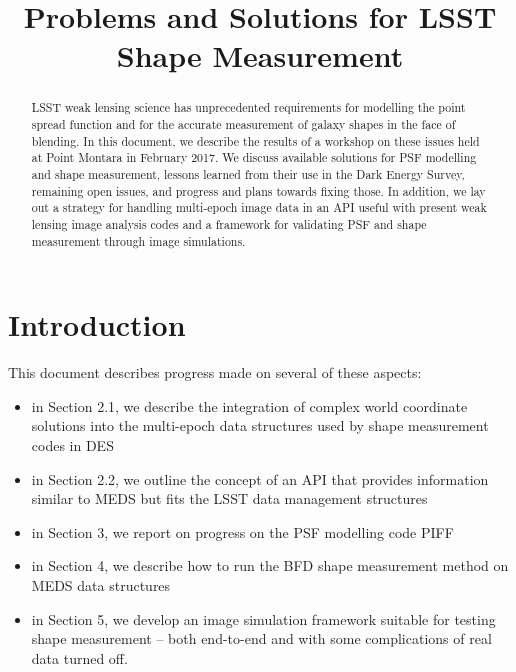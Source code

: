 \documentclass[\docopts]{\docclass}
\begin{document}
\title{ Problems and Solutions for LSST Shape Measurement }

\maketitlepre

\begin{abstract}

LSST weak lensing science has unprecedented requirements for modelling the point spread function and for the accurate measurement of galaxy shapes in the face of blending. In this document, we describe the results of a workshop on these issues held at Point Montara in February 2017. We discuss available solutions for PSF modelling and shape measurement, lessons learned from their use in the Dark Energy Survey, remaining open issues, and progress and plans towards fixing those. In addition, we lay out a strategy for handling multi-epoch image data in an API useful with present weak lensing image analysis codes and a framework for validating PSF and shape measurement through image simulations.

\end{abstract}


\maketitlepost

% 

\section{Introduction}
\label{sec:intro}


This document describes progress made on several of these aspects:
\begin{itemize}
\item in Section 2.1, we describe the integration of complex world coordinate solutions into the multi-epoch data structures used by shape measurement codes in DES
\item in Section 2.2, we outline the concept of an API that provides information similar to MEDS but fits the LSST data management structures
\item in Section 3, we report on progress on the PSF modelling code PIFF
\item in Section 4, we describe how to run the BFD shape measurement method on MEDS data structures
\item in Section 5, we develop an image simulation framework suitable for testing shape measurement -- both end-to-end and with some complications of real data turned off. 
\end{itemize}
\end{document}
